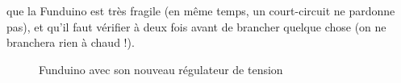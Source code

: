 que la Funduino est très fragile (en même temps, un court-circuit ne pardonne pas), %
et qu'il faut vérifier à deux fois avant de brancher quelque chose (on ne branchera %
rien à chaud !).%
\begin{figure}%
   \caption{\label{funduino_repared} Funduino avec son nouveau régulateur de tension}%
\end{figure}%
